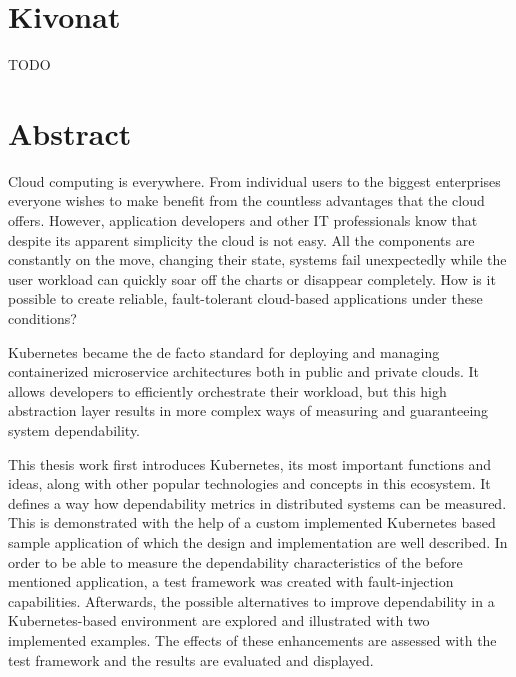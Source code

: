 \setcounter{page}{1}

\selecthungarian

\chapter*{Kivonat}

TODO


\vfill
\selectenglish


\chapter*{Abstract}

Cloud computing is everywhere. From individual users to the biggest enterprises everyone wishes to make benefit from the countless advantages that the cloud offers. However, application developers and other IT professionals know that despite its apparent simplicity the cloud is not easy. All the components are constantly on the move, changing their state, systems fail unexpectedly while the user workload can quickly soar off the charts or disappear completely. How is it possible to create reliable, fault-tolerant cloud-based applications under these conditions?

Kubernetes became the de facto standard for deploying and managing containerized microservice architectures both in public and private clouds. It allows developers to efficiently orchestrate their workload, but this high abstraction layer results in more complex ways of measuring and guaranteeing system dependability.

This thesis work first introduces Kubernetes, its most important functions and ideas, along with other popular technologies and concepts in this ecosystem. It defines a way how dependability metrics in distributed systems can be measured. This is demonstrated with the help of a custom implemented Kubernetes based sample application of which the design and implementation are well described. In order to be able to measure the dependability characteristics of the before mentioned application, a test framework was created with fault-injection capabilities. Afterwards, the possible alternatives to improve dependability in a Kubernetes-based environment are explored and illustrated with two implemented examples. The effects of these enhancements are assessed with the test framework and the results are evaluated and displayed.

